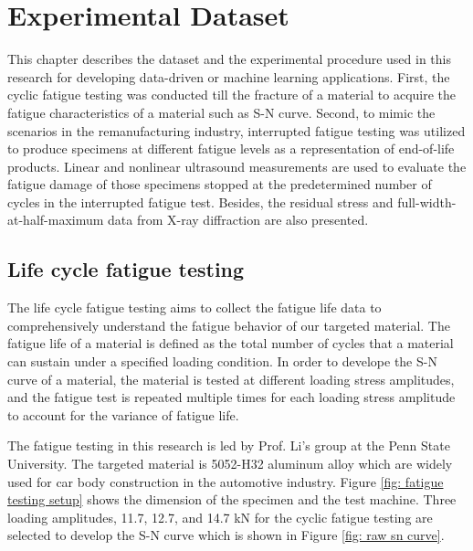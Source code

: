 \chapter{Experimental Dataset}
This chapter describes the dataset and the experimental procedure used in this research for developing data-driven or machine learning applications. First, the cyclic fatigue testing was conducted till the fracture of a material to acquire the fatigue characteristics of a material such as S-N curve. Second, to mimic the scenarios in the remanufacturing industry, interrupted fatigue testing was utilized to produce specimens at different fatigue levels as a representation of end-of-life products. Linear and nonlinear ultrasound measurements are used to evaluate the fatigue damage of those specimens stopped at the predetermined number of cycles in the interrupted fatigue test. Besides, the residual stress and full-width-at-half-maximum data from X-ray diffraction are also presented.

\section{Life cycle fatigue testing}
The life cycle fatigue testing aims to collect the fatigue life data to comprehensively understand the fatigue behavior of our targeted material. The fatigue life of a material is defined as the total number of cycles that a material can sustain under a specified loading condition. In order to develope the S-N curve of a material, the material is tested at different loading stress amplitudes, and the fatigue test is repeated multiple times for each loading stress amplitude to account for the variance of fatigue life.

The fatigue testing in this research is led by Prof. Li's group at the Penn State University. The targeted material is 5052-H32 aluminum alloy which are widely used for car body construction in the automotive industry. Figure \ref{fig: fatigue testing setup} shows the dimension of the specimen and the test machine. Three loading amplitudes, 11.7, 12.7, and 14.7 kN for the cyclic fatigue testing are selected to develop the S-N curve which is shown in Figure \ref{fig: raw sn curve}. 

